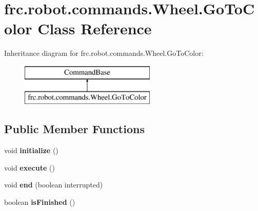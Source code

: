 \hypertarget{classfrc_1_1robot_1_1commands_1_1_wheel_1_1_go_to_color}{}\section{frc.\+robot.\+commands.\+Wheel.\+Go\+To\+Color Class Reference}
\label{classfrc_1_1robot_1_1commands_1_1_wheel_1_1_go_to_color}
Inheritance diagram for frc.\+robot.\+commands.\+Wheel.\+Go\+To\+Color\+:\begin{figure}[H]
\begin{center}
\leavevmode
\includegraphics[height=2.000000cm]{classfrc_1_1robot_1_1commands_1_1_wheel_1_1_go_to_color}
\end{center}
\end{figure}
\subsection*{Public Member Functions}
\begin{DoxyCompactItemize}
\item 
\mbox{\label{classfrc_1_1robot_1_1commands_1_1_wheel_1_1_go_to_color_ab83ace58c01060e0a4e9cc6e7ffed6e5}} 
void {\bfseries initialize} ()
\item 
\mbox{\label{classfrc_1_1robot_1_1commands_1_1_wheel_1_1_go_to_color_af12e74502597e0508e1230f98307c051}} 
void {\bfseries execute} ()
\item 
\mbox{\label{classfrc_1_1robot_1_1commands_1_1_wheel_1_1_go_to_color_aa2d4de3b2382ea217080bfcc1eafc72f}} 
void {\bfseries end} (boolean interrupted)
\item 
\mbox{\label{classfrc_1_1robot_1_1commands_1_1_wheel_1_1_go_to_color_abb7dc8bf8e4b6ff87e43eaba6eb6eddf}} 
boolean {\bfseries is\+Finished} ()
\end{DoxyCompactItemize}
